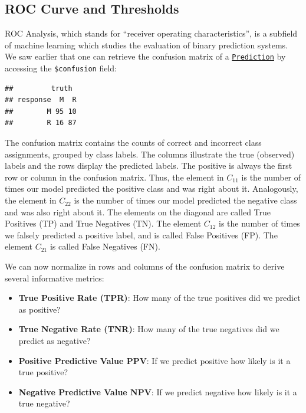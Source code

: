 \documentclass[]{scrbook}
\newenvironment{Shaded}{\begin{snugshade}}{\end{snugshade}}
\newcommand{\DataTypeTok}[1]{\textcolor[rgb]{0.13,0.29,0.53}{#1}}
\newcommand{\KeywordTok}[1]{\textcolor[rgb]{0.13,0.29,0.53}{\textbf{#1}}}
\newcommand{\NormalTok}[1]{#1}
\newcommand{\OperatorTok}[1]{\textcolor[rgb]{0.81,0.36,0.00}{\textbf{#1}}}
\newcommand{\StringTok}[1]{\textcolor[rgb]{0.31,0.60,0.02}{#1}}
\providecommand{\tightlist}{%
  \setlength{\itemsep}{0pt}\setlength{\parskip}{0pt}}
\renewenvironment{Shaded} {\begin{snugshade}\small} {\end{snugshade}}
\begin{document}
\hypertarget{binary-roc}{%
\subsection{ROC Curve and Thresholds}\label{binary-roc}}

ROC Analysis, which stands for ``receiver operating characteristics'', is a subfield of machine learning which studies the evaluation of binary prediction systems.
We saw earlier that one can retrieve the confusion matrix of a \href{https://mlr3.mlr-org.com/reference/Prediction.html}{\texttt{Prediction}} by accessing the \texttt{\$confusion} field:

\begin{Shaded}
\end{Shaded}

\begin{verbatim}
##         truth
## response  M  R
##        M 95 10
##        R 16 87
\end{verbatim}

The confusion matrix contains the counts of correct and incorrect class assignments, grouped by class labels.
The columns illustrate the true (observed) labels and the rows display the predicted labels.
The positive is always the first row or column in the confusion matrix.
Thus, the element in \(C_{11}\) is the number of times our model predicted the positive class and was right about it.
Analogously, the element in \(C_{22}\) is the number of times our model predicted the negative class and was also right about it.
The elements on the diagonal are called True Positives (TP) and True Negatives (TN).
The element \(C_{12}\) is the number of times we falsely predicted a positive label, and is called False Positives (FP).
The element \(C_{21}\) is called False Negatives (FN).

We can now normalize in rows and columns of the confusion matrix to derive several informative metrics:

\begin{itemize}
\tightlist
\item
  \textbf{True Positive Rate (TPR)}: How many of the true positives did we predict as positive?
\item
  \textbf{True Negative Rate (TNR)}: How many of the true negatives did we predict as negative?
\item
  \textbf{Positive Predictive Value PPV}: If we predict positive how likely is it a true positive?
\item
  \textbf{Negative Predictive Value NPV}: If we predict negative how likely is it a true negative?
\end{itemize}
\end{document}
